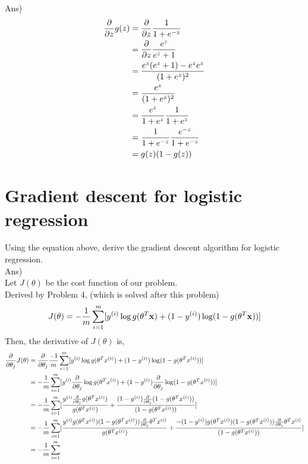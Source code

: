 \documentclass[12pt]{article}%
\begin{document}
Ans) 
\begin{equation}
	\begin{aligned}
		{\partial \over {\partial z}} g(z) & = {\partial \over {\partial z}} {1 \over {1 + e^{-z}}}\\
		& = {\partial \over {\partial z}} {e^z \over {e^z + 1}} \\
		& = {{e^z (e^z + 1) - e^z e^z} \over {(1 +e^z )^2}} \\
		& = {e^z \over {(1 +e^z )^2}} \\
		& = {e^z \over {1 +e^z }} {1 \over {1 +e^z }} \\
		& = {1 \over {1 +e^{-z} }} {e^{-z} \over {1 +e^{-z} }} \\
		& = g(z) (1 - g(z))
	\end{aligned}
\end{equation}

\section{Gradient descent for logistic regression}
Using the equation above, derive the gradient descent algorithm for logistic regression.\\

Ans) \\
Let $J(\theta)$ be the cost function of our problem. \\Derived by Problem 4, (which is solved after this problem)
\begin{equation}
 J(\theta) = - {1 \over m } \sum_{i=1}^{m} [y^{(i)} \log g(\theta^T \mathbf{x}) + (1 - y^{(i)})\log(1 - g(\theta^T \mathbf{x}))]
\end{equation}
Then, the derivative of $J(\theta)$ is, 
\begin{equation}
	\begin{aligned}
		{\partial \over {\partial \theta_j}} J(\theta) & = {\partial \over {\partial \theta_j}} {-1 \over m} \sum_{i=1}^{m} [y^{(i)} \log g(\theta^T x^{(i)}) + (1 - y^{(i)})\log(1 - g(\theta^T x^{(i)}))] \\
		& =- {1 \over m} \sum_{i=1}^{m} [y^{(i)} {\partial \over {\partial \theta_j}} \log g(\theta^T x^{(i)}) + (1 - y^{(i)}) {\partial \over {\partial \theta_j}}\log(1 - g(\theta^T x^{(i)}))] \\
		& = - {1 \over m} \sum_{i=1}^{m} [{{ y^{(i)}{\partial \over {\partial \theta_j}} g(\theta^T x^{(i)})} \over {g(\theta^T x^{(i)})}} + {{ (1-y^{(i)}){\partial \over {\partial \theta_j}} (1-g(\theta^T x^{(i)}))} \over {(1-g(\theta^T x^{(i)}))}}] \\
		& = - {1 \over m} \sum_{i=1}^{m} [{ y^{(i)} g(\theta^T x^{(i)})(1 - g(\theta^T x^{(i)})){\partial \over {\partial \theta_j}} \theta^T x^{(i)} \over {g(\theta^T x^{(i)})}} + {{ -(1-y^{(i)}) g(\theta^T x^{(i)})(1-g(\theta^T x^{(i)}))}{\partial \over {\partial \theta_j}} \theta^T x^{(i)} \over {(1-g(\theta^T x^{(i)}))}}] \\
		& = - {1 \over m} \sum_{i=1}^{m}
	\end{aligned}
\end{equation}
\end{document}
